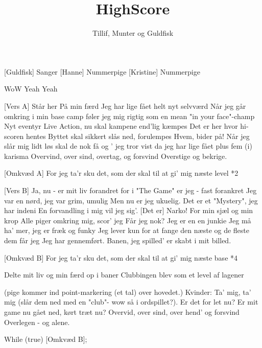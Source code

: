 \documentclass[a4paper,11pt]{article}
\title{HighScore}
\author{Tillif, Munter og Guldfisk}
\begin{document}
\maketitle

\begin{roles}  
[Guldfisk] Sanger
[Hanne] Nummerpige
[Kristine] Nummerpige
\end{roles}

\begin{song}
   WoW
Yeah
Yeah
 

[Vers A]
Står her
På min færd
Jeg har lige fået helt nyt selvværd
Når jeg går omkring i min base camp
føler jeg mig rigtig som en mean "in your face"-champ
Nyt eventyr
Live Action, nu skal kampene end'lig kæmpes
Det er her hvor hi-scoren hentes
Byttet skal sikkert slås ned, forulempes
Hvem, bider på!
Når jeg slår mig lidt løs skal de nok få
og ' jeg tror vist da
jeg har lige fået plus fem (i) karisma
Overvind, over sind, overtag, og forsvind
Overstige og bekrige.
 
[Omkvæd A]
For jeg ta'r sku det, 
som der skal til
at gi' mig næste level *2
 
[Vers B]
Ja, nu - er mit liv forandret
for i "The Game" er jeg - fast forankret
Jeg var en nørd, jeg var grim, umulig
Men nu er jeg ukuelig.
Det er et "Mystery", jeg har indeni
En forvandling i mig
vil jeg sig'. [Det er] Narko!
For min sjæl og min krop
Alle piger omkring mig, scor' jeg
Får jeg nok?
Jeg er en en junkie
Jeg må ha' mer, jeg er fræk og funky
Jeg lever kun for at fange den næste
og de fleste
dem får jeg
Jeg har gennemført.
Banen, jeg spilled'
er skabt i mit billed.
 
[Omkvæd B]
For jeg ta'r sku det, 
som der skal til
at gi' mig næste base *4
 
Delte mit liv og min færd op i baner
Clubbingen blev som et level af lagener
 
(pige kommer ind point-markering (et tal) over hovedet.)
Kvinder: Ta' mig, ta' mig (slår dem ned med en "club"- wow så i ordspillet?).
Er det for let nu?
Er mit game nu gået ned, kørt træt nu?
Overvid, over sind, over hend' og forsvind
Overlegen - og alene.
 
While (true)
   [Omkvæd B];
\end{song}
\end{document}
